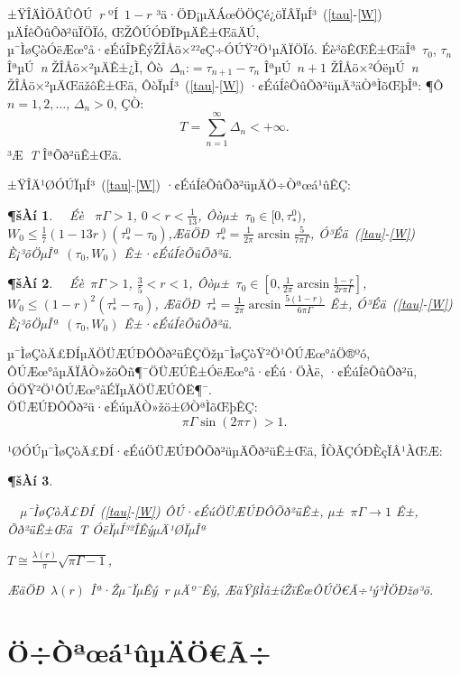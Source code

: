 \documentclass[12pt,openany,CJK,oneside]{cctbook}
\newtheorem{thm} {{\heiti ¶šÀí}}[chapter]
\begin{document}
{±ŸÎÄÌÖÂÛÔÚ\ \emph{r} ºÍ\ $1-r$ ³ä·ÖÐ¡µÄÁœÖÖÇé¿öÏÂÏµÍ³\ (\ref{tau}-\ref{W}) µÄÍêÕûÕð²üÏÖÏó, ŒŽÔÚÓÐÏÞµÄÊ±ŒäÄÚ, µ¯ÌøÇòÓëÆœ°å·¢ÉúÎÞÊýŽÎÅö×²²¢Ç÷ÓÚŸ²Ö¹µÄÏÖÏó. Éè³õÊŒÊ±ŒäÎª\ $\tau_0$, $\tau_n$ ÎªµÚ\ \emph{n} ŽÎÅö×²µÄÊ±¿Ì, Ôò\ $\Delta_n$:$=\tau_{n+1}-\tau_n$ ÎªµÚ\ $n+1$ ŽÎÅö×²ÓëµÚ\ \emph{n} ŽÎÅö×²µÄŒäžôÊ±Œä, ÔòÏµÍ³\ (\ref{tau}-\ref{W}) ·¢ÉúÍêÕûÕð²üµÄ³äÒªÌõŒþÎª: ¶Ô\ $n=1, 2,\dots$, $\Delta_n>0$, ÇÒ:
 \begin{equation}\label{Ctime}
 T=\sum_{n=1}^{\infty}\Delta_n< +\infty.
 \end{equation}
³Æ\ \emph{T} ÎªÕð²üÊ±Œä.

±ŸÎÄ¹ØÓÚÏµÍ³\ (\ref{tau}-\ref{W}) ·¢ÉúÍêÕûÕð²üµÄÖ÷Òªœá¹ûÊÇ:
\begin{thm}\label{T1}
{\upshape\kaishu ~~Éè \ $\pi\Gamma>1$, $0<r<\frac{1}{13}$, Ôòµ±\ $\tau_0\in[0,\tau^0_*)$, \ $W_0\leq \frac{1}{7}(1-13r)(\tau^0_*-\tau_0)$,ÆäÖÐ\ $\tau^0_*=\frac{1}{2\pi}\arcsin\frac{5}{7\pi\Gamma}$, Ó³Éä\ (\ref{tau}-\ref{W}) È¡³õÖµÎª\ $(\tau_0,W_0)$ Ê±·¢ÉúÍêÕûÕð²ü.}
\end{thm}

\begin{thm}\label{T2}
{\upshape\kaishu ~~Éè\ $\pi\Gamma>1$, $\frac{3}{5}<r<1$, Ôòµ±\ $\tau_0\in[0,\frac{1}{2\pi}\arcsin\frac{1-r}{2r\pi\Gamma}]$, \ $W_0\leq (1-r)^2(\tau^1_*-\tau_0)$, ÆäÖÐ\ $\tau^1_*=\frac{1}{2\pi}\arcsin\frac{5(1-r)}{6\pi\Gamma}$ Ê±, Ó³Éä\ (\ref{tau}-\ref{W}) È¡³õÖµÎª\ $(\tau_0,W_0)$ Ê±·¢ÉúÍêÕûÕð²ü.}
\end{thm}

µ¯ÌøÇòÄ£ÐÍµÄÖÜÆÚÐÔÕð²üÊÇÖžµ¯ÌøÇòŸ²Ö¹ÔÚÆœ°åÖ®ºó, ÔÚÆœ°åµÄÏÂÒ»žöÕñ¶¯ÖÜÆÚÊ±ÓëÆœ°å·¢Éú·ÖÀë, ·¢ÉúÍêÕûÕð²ü, ÓÖŸ²Ö¹ÔÚÆœ°åÉÏµÄÖÜÆÚÔË¶¯. ÖÜÆÚÐÔÕð²ü·¢ÉúµÄÒ»žö±ØÒªÌõŒþÊÇ:
\begin{equation}\label{22}
 \pi\Gamma\sin(2\pi\tau)>1.
\end{equation}

¹ØÓÚµ¯ÌøÇòÄ£ÐÍ·¢ÉúÖÜÆÚÐÔÕð²üµÄÕð²üÊ±Œä, ÎÒÃÇÓÐÈçÏÂ¹ÀŒÆ:
\begin{thm}\label{T3}
{\upshape\kaishu ~~µ¯ÌøÇòÄ£ÐÍ\ (\ref{tau}-\ref{W}) ÔÚ·¢ÉúÖÜÆÚÐÔÕð²üÊ±, µ±\ $\pi\Gamma\rightarrow1$ Ê±, Õð²üÊ±Œä\ \emph{T} ÓëÏµÍ³²ÎÊýµÄ¹ØÏµÎª
\begin{center}
  $T\cong\frac{\lambda(r)}{\pi}\sqrt{\pi\Gamma-1}$,
\end{center}
ÆäÖÐ\ $\lambda(r)$ Îª·Žµ¯ÏµÊý\ \emph{r} µÄº¯Êý, ÆäŸßÌå±íŽïÊœÔÚÖ€Ã÷¹ý³ÌÖÐžø³ö.}
\end{thm}

\chapter{\heiti Ö÷Òªœá¹ûµÄÖ€Ã÷}
}
\end{document}
